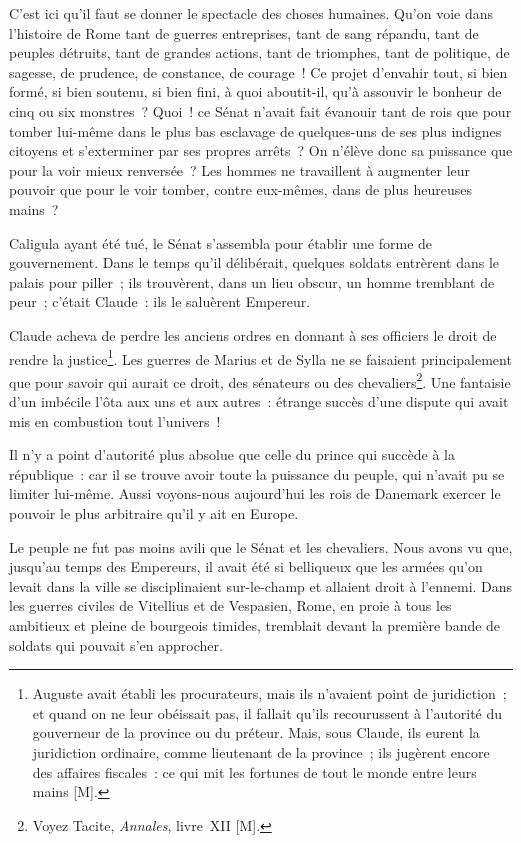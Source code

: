 \documentclass[french,twoside]{book} %
\begin{document}
C’est ici qu’il faut se donner le spectacle des choses humaines. Qu’on voie dans l’histoire de Rome tant de guerres entreprises, tant de sang répandu, tant de peuples détruits, tant de grandes actions, tant de triomphes, tant de politique, de sagesse, de prudence, de constance, de courage ! Ce projet d’envahir tout, si bien formé, si bien soutenu, si bien fini, à quoi aboutit-il, qu’à assouvir le bonheur de cinq ou six monstres ? Quoi ! ce Sénat n’avait fait évanouir tant de rois que pour tomber lui-même dans le plus bas esclavage de quelques-uns de ses plus indignes citoyens et s’exterminer par ses propres arrêts ? On n’élève donc sa puissance que pour la voir mieux renversée ? Les hommes ne travaillent à augmenter leur pouvoir que pour le voir tomber, contre eux-mêmes, dans de plus heureuses mains ?\par
Caligula ayant été tué, le Sénat s’assembla pour établir une forme de gouvernement. Dans le temps qu’il délibérait, quelques soldats entrèrent dans le palais pour piller ; ils trouvèrent, dans un lieu obscur, un homme tremblant de peur ; c’était Claude : ils le saluèrent Empereur.\par
Claude acheva de perdre les anciens ordres en donnant à ses officiers le droit de rendre la justice\footnote{Auguste avait établi les procurateurs, mais ils n’avaient point de juridiction ; et quand on ne leur obéissait pas, il fallait qu’ils recourussent à l’autorité du gouverneur de la province ou du préteur. Mais, sous Claude, ils eurent la juridiction ordinaire, comme lieutenant de la province ; ils jugèrent encore des affaires fiscales : ce qui mit les fortunes de tout le monde entre leurs mains [M].}. Les guerres de Marius et de Sylla ne se faisaient principalement que pour savoir qui aurait ce droit, des sénateurs ou des chevaliers\footnote{Voyez Tacite, {\itshape Annales}, livre XII [M].}. Une fantaisie d’un imbécile l’ôta aux uns et aux autres : étrange succès d’une dispute qui avait mis en combustion tout l’univers !\par
Il n’y a point d’autorité plus absolue que celle du prince qui succède à la république : car il se trouve avoir toute la puissance du peuple, qui n’avait pu se limiter lui-même. Aussi voyons-nous aujourd’hui les rois de Danemark exercer le pouvoir le plus arbitraire qu’il y ait en Europe.\par
Le peuple ne fut pas moins avili que le Sénat et les chevaliers. Nous avons vu que, jusqu’au temps des Empereurs, il avait été si belliqueux que les armées qu’on levait dans la ville se disciplinaient sur-le-champ et allaient droit à l’ennemi. Dans les guerres civiles de Vitellius et de Vespasien, Rome, en proie à tous les ambitieux et pleine de bourgeois timides, tremblait devant la première bande de soldats qui pouvait s’en approcher.\par
\end{document}
